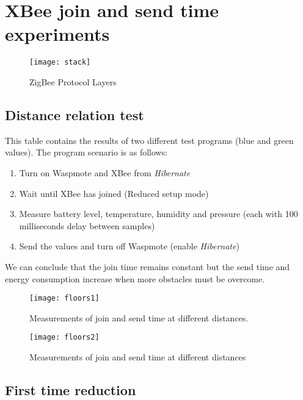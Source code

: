 \section{XBee join and send time experiments} %
\label{AppendixA} 

\begin{figure}[htbp]
\centering
\texttt{[image: stack]}
\caption{ZigBee Protocol Layers}
\label{fig:stack}
\end{figure} 

\subsection{Distance relation test}
This table contains the results of two different test programs (blue and green values). The program scenario is as follows:\\
\begin{enumerate}
\item Turn on Waspmote and XBee from \textit{Hibernate}
\item Wait until XBee has joined (Reduced setup mode)
\item Measure battery level, temperature, humidity and pressure (each with 100 milliseconds delay between samples)
\item Send the values and turn off Waspmote (enable \textit{Hibernate})
\vspace{1cm}
\end{enumerate} 
\vspace{1cm}
\noindent
We can conclude that the join time remains constant but the send time and energy consumption increase when more obstacles must be overcome.
\begin{figure}[htbp]
\centering
\texttt{[image: floors1]}
\caption[XBee join and send times: distance relation]{Measurements of join and send time at different distances.}
\label{fig:floors1}
\end{figure}
\begin{figure}[htbp]
\centering
\texttt{[image: floors2]}
\caption[XBee join and send times: distance relation]{Measurements of join and send time at different distances}
\label{fig:floors2}
\end{figure}

\pagebreak
\subsection{First time reduction}

